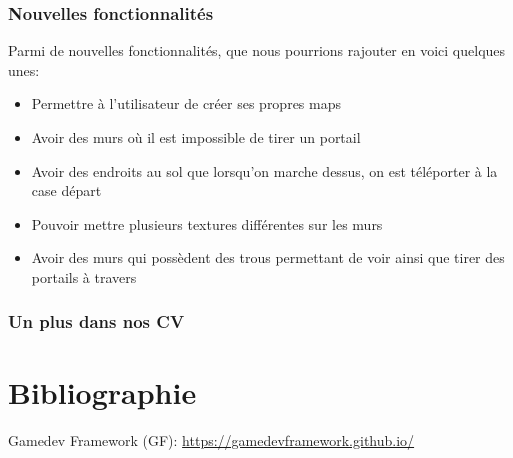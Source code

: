 \documentclass[12pt]{report}
\begin{document}
\subsubsection{Nouvelles fonctionnalités}

Parmi de nouvelles fonctionnalités, que nous pourrions rajouter en voici quelques unes:
\begin{itemize}
	\item Permettre à l'utilisateur de créer ses propres maps
	\item Avoir des murs où il est impossible de tirer un portail
	\item Avoir des endroits au sol que lorsqu'on marche dessus, on est téléporter à la case départ
	\item Pouvoir mettre plusieurs textures différentes sur les murs
	\item Avoir des murs qui possèdent des trous permettant de voir ainsi que tirer des portails à travers
\end{itemize}

\subsubsection{Un plus dans nos CV}

\section{Bibliographie}

Gamedev Framework (GF): \href{https://gamedevframework.github.io/}{https://gamedevframework.github.io/}
\end{document}
